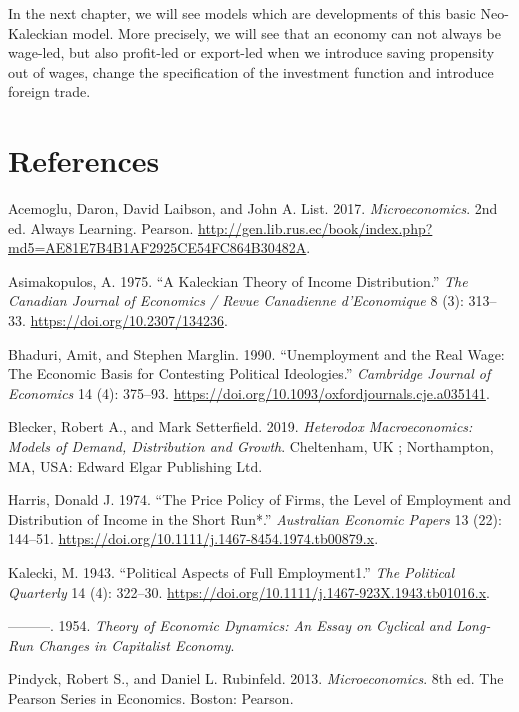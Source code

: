 \documentclass[
  letterpaper,
  DIV=11,
  numbers=noendperiod]{scrreprt}
\newlength{\cslhangindent}
\newlength{\cslentryspacingunit} %
\newenvironment{CSLReferences}[2] %
 {%
  \setlength{\parindent}{0pt}
  \ifodd #1
  \let\oldpar\par
  \def\par{\hangindent=\cslhangindent\oldpar}
  \fi
  \setlength{\parskip}{#2\cslentryspacingunit}
 }%
 {}
\begin{document}
In the next chapter, we will see models which are developments of this
basic Neo-Kaleckian model. More precisely, we will see that an economy
can not always be wage-led, but also profit-led or export-led when we
introduce saving propensity out of wages, change the specification of
the investment function and introduce foreign trade.


\hypertarget{references}{%
\chapter*{References}\label{references}}


\hypertarget{refs}{}
\begin{CSLReferences}{1}{0}
\leavevmode{}%
Acemoglu, Daron, David Laibson, and John A. List. 2017.
\emph{Microeconomics}. 2nd ed. Always Learning. Pearson.
\url{http://gen.lib.rus.ec/book/index.php?md5=AE81E7B4B1AF2925CE54FC864B30482A}.

\leavevmode{}%
Asimakopulos, A. 1975. {``A Kaleckian Theory of Income Distribution.''}
\emph{The Canadian Journal of Economics / Revue Canadienne d'Economique}
8 (3): 313--33. \url{https://doi.org/10.2307/134236}.

\leavevmode{}%
Bhaduri, Amit, and Stephen Marglin. 1990. {``Unemployment and the Real
Wage: The Economic Basis for Contesting Political Ideologies.''}
\emph{Cambridge Journal of Economics} 14 (4): 375--93.
\url{https://doi.org/10.1093/oxfordjournals.cje.a035141}.

\leavevmode{}%
Blecker, Robert A., and Mark Setterfield. 2019. \emph{Heterodox
Macroeconomics: Models of Demand, Distribution and Growth}. Cheltenham,
{UK} ; Northampton, {MA}, {USA}: Edward Elgar Publishing Ltd.

\leavevmode{}%
Harris, Donald J. 1974. {``The Price Policy of Firms, the Level of
Employment and Distribution of Income in the Short Run*.''}
\emph{Australian Economic Papers} 13 (22): 144--51.
\url{https://doi.org/10.1111/j.1467-8454.1974.tb00879.x}.

\leavevmode{}%
Kalecki, M. 1943. {``Political Aspects of Full Employment1.''} \emph{The
Political Quarterly} 14 (4): 322--30.
\url{https://doi.org/10.1111/j.1467-923X.1943.tb01016.x}.

\leavevmode{}%
---------. 1954. \emph{Theory of Economic Dynamics: An Essay on Cyclical
and Long-Run Changes in Capitalist Economy}.

\leavevmode{}%
Pindyck, Robert S., and Daniel L. Rubinfeld. 2013.
\emph{Microeconomics}. 8th ed. The Pearson Series in Economics. Boston:
Pearson.

\end{CSLReferences}
\end{document}
